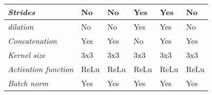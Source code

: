 \begin{table}[h]
\begin{tabular}{|l|l|l|l|l|l|}
		\textit{Strides}                   & No                                                                & No                                                                & Yes                                                               & Yes                                                                                      & No                                                                             \\ \hline
		\textit{dilation}                  & No                                                                & No                                                                & Yes                                                               & Yes                                                                                      & No                                                                             \\ \hline
		\textit{Concatenation}             & Yes                                                               & Yes                                                               & No                                                                & Yes                                                                                      & Yes                                                                            \\ \hline
		\textit{Kernel size}               & 3x3                                                               & 3x3                                                               & 3x3                                                               & 3x3                                                                                      & 3x3                                                                            \\ \hline
		\textit{Activation function}       & ReLu                                                              & ReLu                                                              & ReLu                                                              & ReLu                                                                                     & ReLu                                                                           \\ \hline
		\textit{Batch norm}                & Yes                                                               & Yes                                                               & Yes                                                               & Yes                                                                                      & Yes                                                                            \\ \hline \hline

\end{tabular}
\end{table}

